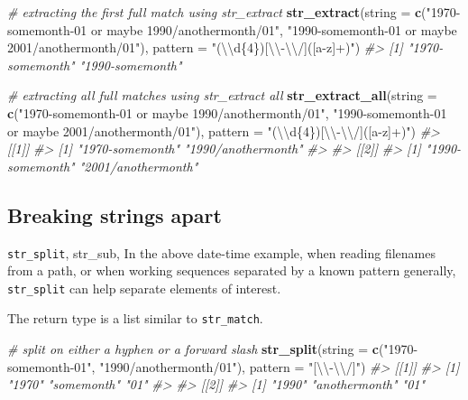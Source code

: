 \documentclass[]{book}
\newenvironment{Shaded}{}{}
\newcommand{\CharTok}[1]{\textcolor[rgb]{0.25,0.44,0.63}{#1}}
\newcommand{\CommentTok}[1]{\textcolor[rgb]{0.38,0.63,0.69}{\textit{#1}}}
\newcommand{\DataTypeTok}[1]{\textcolor[rgb]{0.56,0.13,0.00}{#1}}
\newcommand{\KeywordTok}[1]{\textcolor[rgb]{0.00,0.44,0.13}{\textbf{#1}}}
\newcommand{\NormalTok}[1]{#1}
\newcommand{\StringTok}[1]{\textcolor[rgb]{0.25,0.44,0.63}{#1}}
\begin{document}
\begin{Shaded}
\begin{Highlighting}[]
\CommentTok{# extracting the first full match using str_extract}
\KeywordTok{str_extract}\NormalTok{(}\DataTypeTok{string =} \KeywordTok{c}\NormalTok{(}\StringTok{"1970-somemonth-01 or maybe 1990/anothermonth/01"}\NormalTok{,}
                       \StringTok{"1990-somemonth-01 or maybe 2001/anothermonth/01"}\NormalTok{),}
            \DataTypeTok{pattern =} \StringTok{"(}\CharTok{\textbackslash{}\textbackslash{}}\StringTok{d\{4\})[}\CharTok{\textbackslash{}\textbackslash{}}\StringTok{-}\CharTok{\textbackslash{}\textbackslash{}}\StringTok{/]([a-z]+)"}\NormalTok{)}
\CommentTok{#> [1] "1970-somemonth" "1990-somemonth"}

\CommentTok{# extracting all full matches using str_extract all}
\KeywordTok{str_extract_all}\NormalTok{(}\DataTypeTok{string =} \KeywordTok{c}\NormalTok{(}\StringTok{"1970-somemonth-01 or maybe 1990/anothermonth/01"}\NormalTok{,}
                           \StringTok{"1990-somemonth-01 or maybe 2001/anothermonth/01"}\NormalTok{),}
                \DataTypeTok{pattern =} \StringTok{"(}\CharTok{\textbackslash{}\textbackslash{}}\StringTok{d\{4\})[}\CharTok{\textbackslash{}\textbackslash{}}\StringTok{-}\CharTok{\textbackslash{}\textbackslash{}}\StringTok{/]([a-z]+)"}\NormalTok{)}
\CommentTok{#> [[1]]}
\CommentTok{#> [1] "1970-somemonth"    "1990/anothermonth"}
\CommentTok{#> }
\CommentTok{#> [[2]]}
\CommentTok{#> [1] "1990-somemonth"    "2001/anothermonth"}
\end{Highlighting}
\end{Shaded}

\hypertarget{breaking-strings-apart}{%
\subsection{Breaking strings apart}\label{breaking-strings-apart}}

\texttt{str\_split}, str\_sub,
In the above date-time example, when reading filenames from a path, or when working sequences separated by a known pattern generally, \texttt{str\_split} can help separate elements of interest.

The return type is a list similar to \texttt{str\_match}.

\begin{Shaded}
\begin{Highlighting}[]
\CommentTok{# split on either a hyphen or a forward slash}
\KeywordTok{str_split}\NormalTok{(}\DataTypeTok{string =} \KeywordTok{c}\NormalTok{(}\StringTok{"1970-somemonth-01"}\NormalTok{,}
                     \StringTok{"1990/anothermonth/01"}\NormalTok{),}
          \DataTypeTok{pattern =} \StringTok{"[}\CharTok{\textbackslash{}\textbackslash{}}\StringTok{-}\CharTok{\textbackslash{}\textbackslash{}}\StringTok{/]"}\NormalTok{)}
\CommentTok{#> [[1]]}
\CommentTok{#> [1] "1970"      "somemonth" "01"       }
\CommentTok{#> }
\CommentTok{#> [[2]]}
\CommentTok{#> [1] "1990"         "anothermonth" "01"}
\end{Highlighting}
\end{Shaded}
\end{document}
